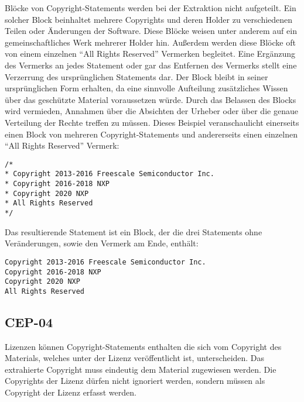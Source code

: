 Blöcke von Copyright-Statements werden bei der Extraktion nicht aufgeteilt.
Ein solcher Block beinhaltet mehrere Copyrights und deren Holder zu verschiedenen Teilen oder Änderungen der Software.
Diese Blöcke weisen unter anderem auf ein gemeinschaftliches Werk mehrerer Holder hin.
Außerdem werden diese Blöcke oft von einem einzelnen \enquote{All Rights Reserved} Vermerken begleitet.
Eine Ergänzung des Vermerks an jedes Statement oder gar das Entfernen des Vermerks stellt eine Verzerrung des ursprünglichen Statements dar.
Der Block bleibt in seiner ursprünglichen Form erhalten, da eine sinnvolle Aufteilung zusätzliches Wissen über das geschützte Material voraussetzen würde.
Durch das Belassen des Blocks wird vermieden, Annahmen über die Absichten der Urheber oder über die genaue Verteilung der Rechte treffen zu müssen.
Dieses Beispiel veranschaulicht einerseits einen Block von mehreren Copyright-Statements und andererseits einen einzelnen \enquote{All Rights Reserved} Vermerk:

\begin{lstlisting}[numbers=none, keepspaces=true]
/*
* Copyright 2013-2016 Freescale Semiconductor Inc.
* Copyright 2016-2018 NXP
* Copyright 2020 NXP
* All Rights Reserved
*/
\end{lstlisting}

Das resultierende Statement ist ein Block, der die drei Statements ohne Veränderungen, sowie den Vermerk am Ende, enthält:

\begin{lstlisting}[numbers=none, keepspaces=true]
Copyright 2013-2016 Freescale Semiconductor Inc.
Copyright 2016-2018 NXP
Copyright 2020 NXP
All Rights Reserved
\end{lstlisting}


\subsection{CEP-04}\label{subsec:cep-04}

Lizenzen können Copyright-Statements enthalten die sich vom Copyright des Materials, welches unter der Lizenz veröffentlicht ist, unterscheiden.
Das extrahierte Copyright muss eindeutig dem Material zugewiesen werden.
Die Copyrights der Lizenz dürfen nicht ignoriert werden, sondern müssen als Copyright der Lizenz erfasst werden.



